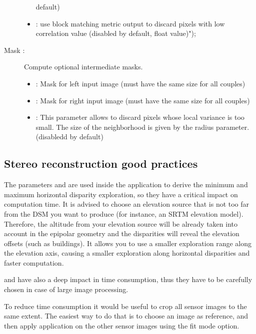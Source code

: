 \begin{description}
\begin{itemize}
default)
\item {} : use block matching metric output to discard pixels with low correlation value (disabled by default, float value)");
\end{itemize}
\item[Mask : ] Compute optional intermediate masks.
\begin{itemize}
 \item {} : Mask for left input image (must have the same size
 for all couples)
 \item {} : Mask for right input image  (must have the same size
 for all couples)
 \item {} : This parameter allows to discard pixels whose
 local variance is too small. The size of the neighborhood is given by the
 radius parameter. (disabledd by default)
\end{itemize}
\end{description}

\subsection{Stereo reconstruction good practices}

The parameters  and  are used
inside the application to derive the minimum and maximum horizontal disparity exploration, so they have a critical impact on 
computation time. It is advised to choose an elevation source that is not too far from the
DSM you want to produce (for instance, an SRTM elevation model). Therefore, the altitude 
from your elevation source will be already taken into account in the epipolar geometry
and the disparities will reveal the elevation offsets (such as buildings). It allows you
 to use a smaller exploration range along the elevation axis, causing a smaller exploration
along horizontal disparities and faster computation.

 and  have also a
deep impact in time consumption, thus they have to be carefully chosen in case
of large image processing. 

To reduce time consumption it would be useful to crop
all sensor images to the same extent. The easiest way to do
that is to choose an image as reference, and then apply 
 application on the other sensor images using the
fit mode  option.

